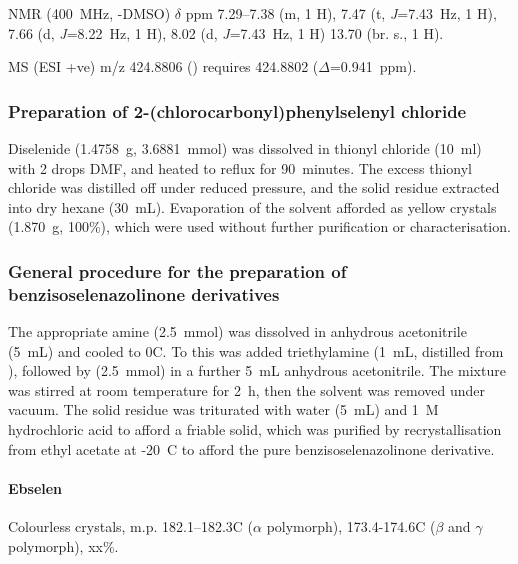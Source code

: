{\footnotesize

 NMR (400~MHz, -DMSO) $\delta$ ppm
7.29--7.38 (m, 1 H),
7.47 (t, \emph{J}=7.43~Hz, 1 H),
7.66 (d, \emph{J}=8.22~Hz, 1 H),
8.02 (d, \emph{J}=7.43~Hz, 1 H)
13.70 (br. s., 1 H).

MS (ESI +ve) m/z 424.8806 ()  requires 424.8802 ($\Delta$=0.941~ppm).
}

\subsubsection[Preparation of \refcmpd{dichloride}]{Preparation of 2-(chlorocarbonyl)phenylselenyl chloride }
Diselenide  (1.4758~g, 3.6881~mmol) was dissolved in thionyl chloride (10~ml) with 2 drops DMF, and heated to reflux for 90~minutes.
The excess thionyl chloride was distilled off under reduced pressure, and the solid residue extracted into dry hexane (30~mL).
Evaporation of the solvent afforded  as yellow crystals (1.870~g, 100\%), which were used without further purification or characterisation.

\subsubsection[General procedure for the preparation of benzisoselenazolinone derivatives]{General procedure for the preparation of benzisoselenazolinone derivatives }
The appropriate amine (2.5~mmol) was dissolved in anhydrous acetonitrile (5~mL) and cooled to 0\degree C.
To this was added triethylamine (1~mL, distilled from ), followed by  (2.5~mmol) in a further 5~mL anhydrous acetonitrile.
The mixture was stirred at room temperature for 2~h, then the solvent was removed under vacuum.
The solid residue was triturated with water (5~mL) and 1~\textsc{M} hydrochloric acid to afford a friable solid, which was purified by recrystallisation from ethyl acetate at -20\degree~C to afford the pure benzisoselenazolinone derivative.

\paragraph{Ebselen }
Colourless crystals, m.p. 182.1--182.3\degree C ($\alpha$ polymorph), 173.4-174.6\degree C ($\beta$ and $\gamma$ polymorph), xx\%.


